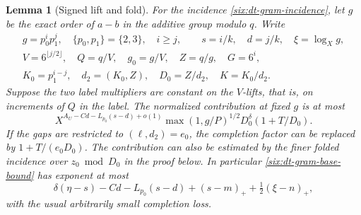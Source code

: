 \documentclass[11pt,a4paper]{article}
\theoremstyle{paperplain}
\newtheorem{lemma}[theorem]{Lemma}
\numberwithin{equation}{section}
\begin{document}
\begin{lemma}[Signed lift and fold]\label{six:dt-gram-base}
For the incidence \eqref{six:dt-gram-incidence}, let \(g\) be the
exact order of \(a-b\) in the additive group modulo \(q\).
Write
\begin{equation}
 \begin{gathered}
 g=p_0^ip_1^j,\quad \{p_0,p_1\}=\{2,3\},\quad i\ge j,\qquad
 s=i/k,\quad d=j/k,\quad \xi=\log_X g,\\
 V=6^{\lfloor j/2\rfloor},\quad Q=q/V,\quad
 g_0=g/V,\quad Z=q/g,\quad G=6^i,\\
 K_0=p_1^{i-j},\quad d_2=(K_0,Z),\quad
 D_0=Z/d_2,\quad K=K_0/d_2.
 \end{gathered}
 \label{six:dt-gram-order}
\end{equation}
Suppose the two label multipliers are constant on the
\(V\)-lifts, that is, on increments of \(Q\) in the label.
The normalized contribution at fixed \(g\) is at most
\begin{equation}
 X^{A_U-Cd-L_{p_0}(s-d)+o(1)}
       \max(1,g/P)^{1/2}D_0^\delta(1+T/D_0).
 \label{six:dt-gram-base-bound}
\end{equation}
If the gaps are restricted to \((\ell,d_2)=e_0\), the
completion factor can be replaced by \(1+T/(e_0D_0)\).
The contribution can also be estimated by the finer folded
incidence over \(z_0\bmod D_0\) in the proof below.
In particular \eqref{six:dt-gram-base-bound} has exponent at most
\begin{equation}
 \delta(\eta-s)-Cd-L_{p_0}(s-d)+(s-m)_+
                                    +\tfrac12(\xi-n)_+,
 \label{six:dt-gram-base-exponent}
\end{equation}
with the usual arbitrarily small completion loss.
\end{lemma}
\end{document}
